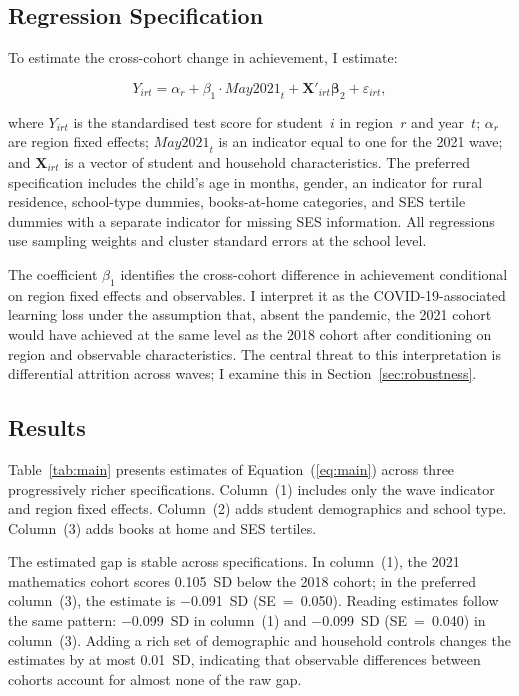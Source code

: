 \subsection{Regression Specification}
\label{subsec:specification}

To estimate the cross-cohort change in achievement, I estimate:

\begin{equation}
Y_{irt} = \alpha_r + \beta_1 \cdot \mathit{May2021}_t
          + \mathbf{X}'_{irt} \boldsymbol{\beta}_2 + \varepsilon_{irt},
\label{eq:main}
\end{equation}

\noindent where $Y_{irt}$ is the standardised test score for student~$i$ in
region~$r$ and year~$t$; $\alpha_r$ are region fixed effects; $\mathit{May2021}_t$
is an indicator equal to one for the 2021 wave; and $\mathbf{X}_{irt}$ is a
vector of student and household characteristics. The preferred specification
includes the child's age in months, gender, an indicator for rural residence,
school-type dummies, books-at-home categories, and SES tertile dummies with a
separate indicator for missing SES information. All regressions use sampling
weights and cluster standard errors at the school level.

The coefficient $\beta_1$ identifies the cross-cohort difference in achievement
conditional on region fixed effects and observables. I interpret it as the
COVID-19-associated learning loss under the assumption that, absent the pandemic,
the 2021 cohort would have achieved at the same level as the 2018 cohort after
conditioning on region and observable characteristics. The central threat to this
interpretation is differential attrition across waves; I examine this in
Section~\ref{sec:robustness}.

\subsection{Results}
\label{subsec:main_results}

Table~\ref{tab:main} presents estimates of Equation~(\ref{eq:main}) across three
progressively richer specifications. Column~(1) includes only the wave indicator
and region fixed effects. Column~(2) adds student demographics and school type.
Column~(3) adds books at home and SES tertiles.

The estimated gap is stable across specifications. In column~(1), the 2021
mathematics cohort scores 0.105~SD below the 2018 cohort; in the preferred
column~(3), the estimate is $-$0.091~SD (SE~=~0.050). Reading estimates follow
the same pattern: $-$0.099~SD in column~(1) and $-$0.099~SD (SE~=~0.040) in
column~(3). Adding a rich set of demographic and household controls changes the
estimates by at most 0.01~SD, indicating that observable differences between
cohorts account for almost none of the raw gap.

